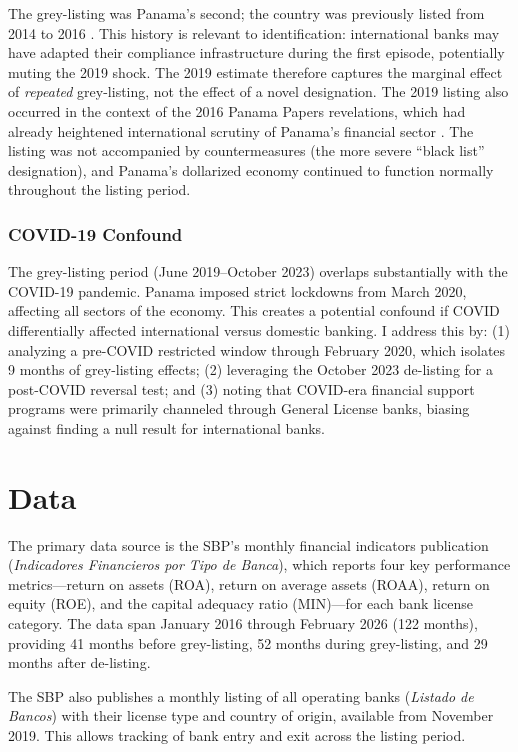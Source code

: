 \documentclass[12pt]{article}
\begin{document}
The grey-listing was Panama's second; the country was previously listed from 2014 to 2016 \citep{fatf2019}. This history is relevant to identification: international banks may have adapted their compliance infrastructure during the first episode, potentially muting the 2019 shock. The 2019 estimate therefore captures the marginal effect of \textit{repeated} grey-listing, not the effect of a novel designation. The 2019 listing also occurred in the context of the 2016 Panama Papers revelations, which had already heightened international scrutiny of Panama's financial sector \citep{odonovan2019}. The listing was not accompanied by countermeasures (the more severe ``black list'' designation), and Panama's dollarized economy continued to function normally throughout the listing period.

\subsubsection*{COVID-19 Confound}
The grey-listing period (June 2019--October 2023) overlaps substantially with the COVID-19 pandemic. Panama imposed strict lockdowns from March 2020, affecting all sectors of the economy. This creates a potential confound if COVID differentially affected international versus domestic banking. I address this by: (1) analyzing a pre-COVID restricted window through February 2020, which isolates 9 months of grey-listing effects; (2) leveraging the October 2023 de-listing for a post-COVID reversal test; and (3) noting that COVID-era financial support programs were primarily channeled through General License banks, biasing against finding a null result for international banks.


\section{Data}

The primary data source is the SBP's monthly financial indicators publication (\textit{Indicadores Financieros por Tipo de Banca}), which reports four key performance metrics---return on assets (ROA), return on average assets (ROAA), return on equity (ROE), and the capital adequacy ratio (MIN)---for each bank license category. The data span January 2016 through February 2026 (122 months), providing 41 months before grey-listing, 52 months during grey-listing, and 29 months after de-listing.

The SBP also publishes a monthly listing of all operating banks (\textit{Listado de Bancos}) with their license type and country of origin, available from November 2019. This allows tracking of bank entry and exit across the listing period.
\end{document}
